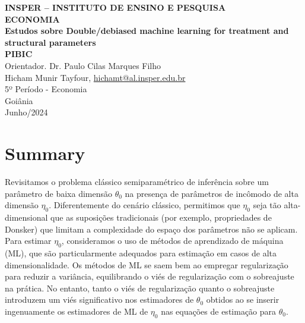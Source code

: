 \documentclass[a4paper,12pt]{article}[abntex2]
\begin{document}
\begin{titlepage}
    \centering
    \vspace*{1cm}
    \Large\textbf{INSPER – INSTITUTO DE ENSINO E PESQUISA}\\
    \Large \textbf{ECONOMIA}\\
    \vspace{1.5cm}
    \Large\textbf{Estudos sobre Double/debiased machine learning for treatment
and structural  parameters}\\
    \textbf{PIBIC}\\
    \vspace{1.5cm}
    Orientador. Dr. Paulo Cilas Marques Filho\\
    \vfill
    \normalsize
    Hicham Munir Tayfour, \href{mailto:hichamt@al.insper.edu.br}{hichamt@al.insper.edu.br}\\
    5º Período - Economia\\
    \vfill
    Goiânia\\
    Junho/2024
\end{titlepage}

\newpage
\tableofcontents
\thispagestyle{empty} %
\newpage
\setcounter{page}{1} %
\justify
\onehalfspacing

\pagestyle{fancy}
\fancyhf{}
\rhead{\thepage}

\section*{Summary}
Revisitamos o problema clássico semiparamétrico de inferência sobre um parâmetro de baixa dimensão $\theta_0$ na presença de parâmetros de incômodo de alta dimensão $\eta_0$. Diferentemente do cenário clássico, permitimos que $\eta_0$ seja tão alta-dimensional que as suposições tradicionais (por exemplo, propriedades de Donsker) que limitam a complexidade do espaço dos parâmetros não se aplicam. Para estimar $\eta_0$, consideramos o uso de métodos de aprendizado de máquina (ML), que são particularmente adequados para estimação em casos de alta dimensionalidade. Os métodos de ML se saem bem ao empregar regularização para reduzir a variância, equilibrando o viés de regularização com o sobreajuste na prática. No entanto, tanto o viés de regularização quanto o sobreajuste introduzem um viés significativo nos estimadores de $\theta_0$ obtidos ao se inserir ingenuamente os estimadores de ML de $\eta_0$ nas equações de estimação para $\theta_0$. 
\end{document}

